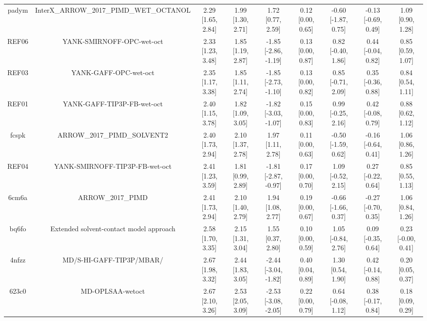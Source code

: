 \documentclass{article}
\begin{document}
\begin{center}
\begin{longtable}{|ccccccccc|}
 padym &            InterX\_ARROW\_2017\_PIMD\_WET\_OCTANOL &  2.29 [1.65, 2.84] &  1.99 [1.30, 2.71] &     1.72 [0.77, 2.59] &  0.12 [0.00, 0.65] &  -0.60 [-1.87, 0.75] &  -0.13 [-0.69, 0.49] &     1.09 [0.90, 1.28] \\
 REF06 &                          YANK-SMIRNOFF-OPC-wet-oct &  2.33 [1.23, 3.48] &  1.85 [1.19, 2.87] &  -1.85 [-2.86, -1.19] &  0.13 [0.00, 0.87] &   0.82 [-0.40, 1.86] &   0.44 [-0.04, 0.82] &     0.85 [0.59, 1.07] \\
 REF03 &                              YANK-GAFF-OPC-wet-oct &  2.35 [1.17, 3.38] &  1.85 [1.11, 2.74] &  -1.85 [-2.73, -1.10] &  0.13 [0.00, 0.82] &   0.85 [-0.71, 2.09] &   0.35 [-0.36, 0.88] &     0.84 [0.54, 1.11] \\
 REF01 &                         YANK-GAFF-TIP3P-FB-wet-oct &  2.40 [1.15, 3.78] &  1.82 [1.09, 3.05] &  -1.82 [-3.03, -1.07] &  0.15 [0.00, 0.83] &   0.99 [-0.25, 2.16] &   0.42 [-0.08, 0.79] &     0.88 [0.62, 1.12] \\
 fcspk &                        ARROW\_2017\_PIMD\_SOLVENT2 &  2.40 [1.73, 2.94] &  2.10 [1.37, 2.78] &     1.97 [1.11, 2.78] &  0.11 [0.00, 0.63] &  -0.50 [-1.59, 0.62] &  -0.16 [-0.64, 0.41] &     1.06 [0.86, 1.26] \\
 REF04 &                     YANK-SMIRNOFF-TIP3P-FB-wet-oct &  2.41 [1.23, 3.59] &  1.81 [0.99, 2.89] &  -1.81 [-2.87, -0.97] &  0.17 [0.00, 0.70] &   1.09 [-0.52, 2.15] &   0.27 [-0.22, 0.64] &     0.85 [0.55, 1.13] \\
 6cm6a &                                  ARROW\_2017\_PIMD &  2.41 [1.73, 2.94] &  2.10 [1.40, 2.79] &     1.94 [1.08, 2.77] &  0.19 [0.00, 0.67] &  -0.66 [-1.66, 0.37] &  -0.27 [-0.70, 0.35] &     1.06 [0.84, 1.26] \\
 bq6fo &            Extended solvent-contact model approach &  2.58 [1.70, 3.35] &  2.15 [1.31, 3.04] &     1.55 [0.37, 2.80] &  0.10 [0.00, 0.59] &   1.05 [-0.84, 2.76] &   0.09 [-0.35, 0.64] &    0.23 [-0.00, 0.41] \\
 4nfzz &                           MD/S-HI-GAFF-TIP3P/MBAR/ &  2.67 [1.98, 3.32] &  2.44 [1.83, 3.05] &  -2.44 [-3.04, -1.82] &  0.40 [0.04, 0.89] &    1.30 [0.54, 1.90] &   0.42 [-0.14, 0.88] &     0.20 [0.05, 0.37] \\
 623c0 &                                   MD-OPLSAA-wetoct &  2.67 [2.10, 3.26] &  2.53 [2.05, 3.09] &  -2.53 [-3.08, -2.05] &  0.22 [0.00, 0.79] &   0.64 [-0.08, 1.12] &   0.38 [-0.17, 0.84] &     0.18 [0.09, 0.29] \\

\end{longtable}
\end{center}
\end{document}
